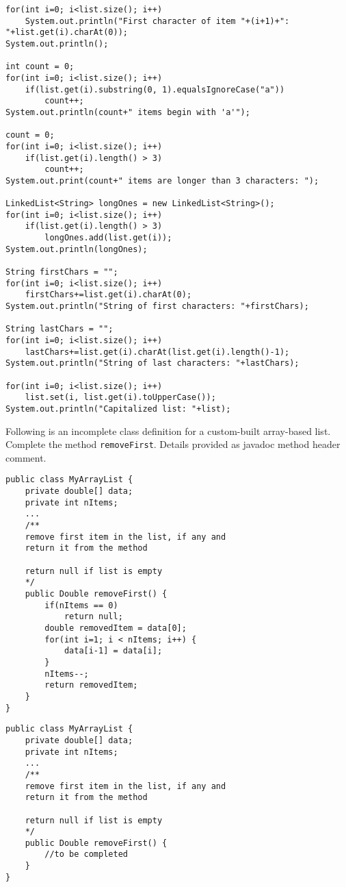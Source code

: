 \begin{questions}
\begin{solution}
\begin{lstlisting}
for(int i=0; i<list.size(); i++)
	System.out.println("First character of item "+(i+1)+": "+list.get(i).charAt(0));
System.out.println();

int count = 0;
for(int i=0; i<list.size(); i++)
	if(list.get(i).substring(0, 1).equalsIgnoreCase("a"))
		count++;
System.out.println(count+" items begin with 'a'");

count = 0;
for(int i=0; i<list.size(); i++)
	if(list.get(i).length() > 3)
		count++;
System.out.print(count+" items are longer than 3 characters: ");

LinkedList<String> longOnes = new LinkedList<String>();
for(int i=0; i<list.size(); i++)
	if(list.get(i).length() > 3)
		longOnes.add(list.get(i));
System.out.println(longOnes);

String firstChars = "";
for(int i=0; i<list.size(); i++)
	firstChars+=list.get(i).charAt(0);
System.out.println("String of first characters: "+firstChars);

String lastChars = "";
for(int i=0; i<list.size(); i++)
	lastChars+=list.get(i).charAt(list.get(i).length()-1);
System.out.println("String of last characters: "+lastChars);

for(int i=0; i<list.size(); i++)
	list.set(i, list.get(i).toUpperCase());
System.out.println("Capitalized list: "+list);
\end{lstlisting}
\end{solution}

\question Following is an incomplete class definition for a custom-built array-based list. Complete the method \texttt{removeFirst}. Details provided as javadoc method header comment.

\ifprintanswers
\begin{lstlisting}
public class MyArrayList {
	private double[] data;
	private int nItems;
	...
	/**
	remove first item in the list, if any and
	return it from the method
	
	return null if list is empty
	*/
	public Double removeFirst() {
		if(nItems == 0) 
			return null;
		double removedItem = data[0];
		for(int i=1; i < nItems; i++) {
			data[i-1] = data[i];
		}
		nItems--;
		return removedItem;
	}
}
\end{lstlisting}
\else
\begin{lstlisting}
public class MyArrayList {
	private double[] data;
	private int nItems;
	...
	/**
	remove first item in the list, if any and
	return it from the method
	
	return null if list is empty
	*/
	public Double removeFirst() {
		//to be completed
	}
}
\end{lstlisting}
\fi


\end{questions}
